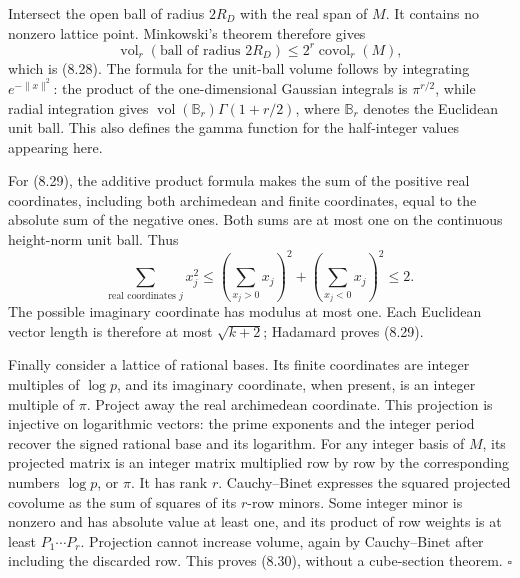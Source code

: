 \documentclass[
  11pt,
  a4paper,
]{article}
\begin{document}
Intersect the open ball of radius \(2R_D\) with the real span of \(M\).
It contains no nonzero lattice point. Minkowski's theorem therefore
gives \[
\operatorname{vol}_r(\text{ball of radius }2R_D)
\le2^r\operatorname{covol}_r(M),
\] which is (8.28). The formula for the unit-ball volume follows by
integrating \(e^{-\|x\|^2}\): the product of the one-dimensional
Gaussian integrals is \(\pi^{r/2}\), while radial integration gives
\(\operatorname{vol}(\mathbb B_r)\Gamma(1+r/2)\), where \(\mathbb B_r\)
denotes the Euclidean unit ball. This also defines the gamma function
for the half-integer values appearing here.

For (8.29), the additive product formula makes the sum of the positive
real coordinates, including both archimedean and finite coordinates,
equal to the absolute sum of the negative ones. Both sums are at most
one on the continuous height-norm unit ball. Thus \[
\sum_{\text{real coordinates }j} x_j^2
\le\left(\sum_{x_j>0}x_j\right)^2
+\left(\sum_{x_j<0}x_j\right)^2\le2.
\] The possible imaginary coordinate has modulus at most one. Each
Euclidean vector length is therefore at most \(\sqrt{k+2}\); Hadamard
proves (8.29).

Finally consider a lattice of rational bases. Its finite coordinates are
integer multiples of \(\log p\), and its imaginary coordinate, when
present, is an integer multiple of \(\pi\). Project away the real
archimedean coordinate. This projection is injective on logarithmic
vectors: the prime exponents and the integer period recover the signed
rational base and its logarithm. For any integer basis of \(M\), its
projected matrix is an integer matrix multiplied row by row by the
corresponding numbers \(\log p\), or \(\pi\). It has rank \(r\).
Cauchy--Binet expresses the squared projected covolume as the sum of
squares of its \(r\)-row minors. Some integer minor is nonzero and has
absolute value at least one, and its product of row weights is at least
\(P_1\cdots P_r\). Projection cannot increase volume, again by
Cauchy--Binet after including the discarded row. This proves (8.30),
without a cube-section theorem. \(\square\)
\end{document}
